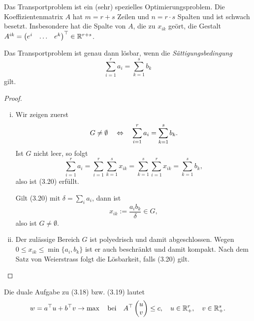 \begin{rmrk} %
  Das Transportproblem ist ein (sehr) spezielles Optimierungsproblem. Die
  Koeffizientenmatrix $A$ hat $m = r + s$ Zeilen und $n = r \cdot s$ Spalten und
  ist schwach besetzt. Insbesondere hat die Spalte von $A$, die zu $x_{ik}$
  geört, die Gestalt $A^{ik} = \begin{pmatrix} e^i & \ldots & e^k\end{pmatrix}^\top \in \mathbb{R}^{r+s}$.
\end{rmrk}

\begin{thm} %
  Das Transportproblem ist genau dann lösbar, wenn die
  \emph{Sättigungsbedingung}
  \begin{equation} %
    \sum_{i=1}^r a_i = \sum_{k=1}^s b_k
  \end{equation}
  gilt.
\end{thm}

\begin{proof}
  \begin{enumerate}[(i)]
  \item Wir zeigen zuerst
    \[ G \ne \emptyset \quad \Leftrightarrow \quad  \sum_{i=1}^r a_i = \sum_{k=1}^s b_k. \]
    Ist $G$ nicht leer, so folgt
    \[ \sum_{i=1}^r a_i = \sum_{i=1}^r \sum_{k=1}^s x_{ik} =
      \sum_{k=1}^s \sum_{i=1}^r x_{ik} = \sum_{k=1}^s b_k, \]
    also ist (3.20) erfüllt.

    Gilt (3.20) mit $\delta = \sum_i a_i$, dann ist
    \[ x_{ik} := \frac{ a_i b_k }{\delta} \in G, \]
    also ist $G \ne \emptyset$.
  \item Der zulässige Bereich $G$ ist polyedrisch und damit abgeschlossen. Wegen
    $0 \le x_{ik} \le \min \{a_i, b_k\}$ ist er auch beschränkt und damit
    kompakt. Nach dem Satz von Weierstrass folgt die Lösbarkeit, falls (3.20)
    gilt. \qedhere
  \end{enumerate}
\end{proof}

Die duale Aufgabe zu (3.18) bzw. (3.19) lautet
\begin{equation} %
  w = a^\top u + b^\top v \to \max \subjto A^\top \pmat{u\\v} \le c, \quad
  u \in \real^r_+, \quad v \in \real^s_+.
\end{equation}

